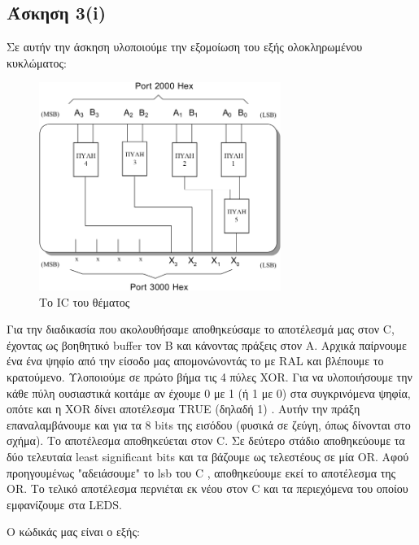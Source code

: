 \documentclass[a4paper,10pt]{article} \usepackage{anysize}
\begin{document}


\section*{} 
\subsection*{Άσκηση 3(i)}
Σε αυτήν την άσκηση υλοποιούμε την εξομοίωση του εξής ολοκληρωμένου
κυκλώματος:
\begin{figure}[h]
\centering
\includegraphics[width=0.7\textwidth]{files/ask_3_i_IC.png}
\caption{Το IC του θέματος}
\end{figure}
Για την διαδικασία που ακολουθήσαμε αποθηκεύσαμε το αποτέλεσμά μας στον C,
έχοντας ως βοηθητικό buffer τον B και κάνοντας πράξεις στον Α. Αρχικά
παίρνουμε ένα ένα ψηφίο από την είσοδο μας απομονώνοντάς το με RAL και
βλέπουμε το κρατούμενο. Υλοποιούμε σε πρώτο βήμα τις 4 πύλες XOR. Για να
υλοποιήσουμε την κάθε πύλη ουσιαστικά κοιτάμε αν έχουμε 0 με 1 (ή 1 με 0) στα
συγκρινόμενα ψηφία, οπότε και η XOR δίνει αποτέλεσμα TRUE (δηλαδή 1) . Αυτήν
την πράξη επαναλαμβάνουμε και για τα 8 bits της εισόδου (φυσικά σε ζεύγη, όπως
δίνονται στο σχήμα). Το αποτέλεσμα αποθηκεύεται στον C. Σε δεύτερο στάδιο
αποθηκεύουμε τα δύο τελευταία least significant bits και τα βάζουμε ως
τελεστέους σε μία OR. Αφού προηγουμένως "αδειάσουμε" το lsb του C ,
αποθηκεύουμε εκεί το αποτέλεσμα της OR. Το τελικό αποτέλεσμα περνιέται εκ νέου
στον C και τα περιεχόμενα του οποίου εμφανίζουμε στα LEDS.

Ο κώδικάς μας είναι ο εξής:
\inputminted[linenos,obeytabs,frame=leftline,fontsize=\footnotesize]{oldasm}{files/askhsh_3_i.8085}
\end{document}
